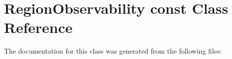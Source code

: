 \hypertarget{classRegionObservability_01const}{}\section{Region\+Observability const Class Reference}
\label{classRegionObservability_01const}


The documentation for this class was generated from the following files\+:
